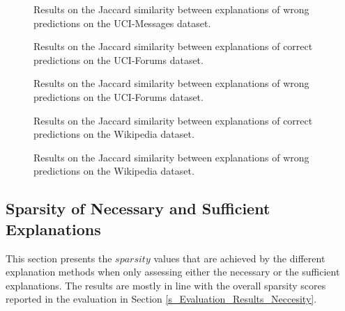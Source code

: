 \begin{figure}[ht]
    \centering
    
    \caption{Results on the Jaccard similarity between explanations of wrong predictions on the UCI-Messages dataset.}
\end{figure}

\begin{figure}[ht]
    \centering
    
    \caption{Results on the Jaccard similarity between explanations of correct predictions on the UCI-Forums dataset.}
\end{figure}

\begin{figure}[ht]
    \centering
    
    \caption{Results on the Jaccard similarity between explanations of wrong predictions on the UCI-Forums dataset.}
\end{figure}

\begin{figure}[ht]
    \centering
    
    \caption{Results on the Jaccard similarity between explanations of correct predictions on the Wikipedia dataset.}
\end{figure}

\begin{figure}[ht]
    \centering
    
    \caption{Results on the Jaccard similarity between explanations of wrong predictions on the Wikipedia dataset.}
\end{figure}



\iffalse

\FloatBarrier
\subsection{Sparsity of Necessary and Sufficient Explanations}
\label{s_Appendix_spar_nec_suf}

This section presents the $sparsity$ values that are achieved by the different explanation methods when only assessing either the necessary or the sufficient explanations. The results are mostly in line with the overall sparsity scores reported in the evaluation in Section \ref{s_Evaluation_Results_Neccesity}.

